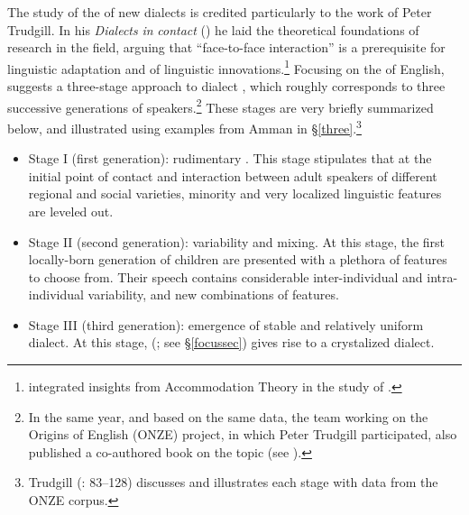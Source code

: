 \documentclass[output=paper]{langsci/langscibook}
\begin{document}
The study of the  of new dialects is credited particularly to the work of Peter Trudgill. In his \textit{Dialects} \textit{in} \textit{contact} (\citeyear{Trudgill1986}) he laid the theoretical foundations of research in the field, arguing that ``face-to-face interaction'' is a prerequisite for linguistic adaptation and  of linguistic innovations.\footnote{\citet{Trudgill1986} integrated insights from Accommodation Theory \citep{Giles1973} in the study of .} Focusing on the  of  {English}, \citet{Trudgill2004} suggests a three-stage approach to dialect , which roughly corresponds to three successive generations of speakers.\footnote{In the same year, and based on the same data, the team working on the Origins of  {English} (ONZE) project, in which Peter Trudgill participated, also published a co-authored book on the topic (see \citealt{GordonEtAl2004}).} These stages are very briefly summarized below, and illustrated using examples from Amman in §\ref{three}.\footnote{Trudgill (\citeyear{Trudgill2004}: 83–128) discusses and illustrates each stage with data from the ONZE corpus.}

\begin{itemize}
    \item[] 
Stage I (first generation): rudimentary . This stage stipulates that at the initial point of contact and interaction between adult speakers of different regional and social varieties, minority and very localized linguistic features are leveled out.

\item[]
Stage II (second generation): variability and mixing. At this stage, the first locally-born generation of children are presented with a plethora of features to choose from. Their speech contains considerable inter-individual and intra-individual variability, and new combinations of features.

\item[] 
Stage III (third generation): emergence of stable and relatively uniform dialect. At this stage,  (\citealt{LePageTabouret-Keller1985}; see §\ref{focussec}) gives rise to a crystalized dialect. 
\end{itemize}
\end{document}
